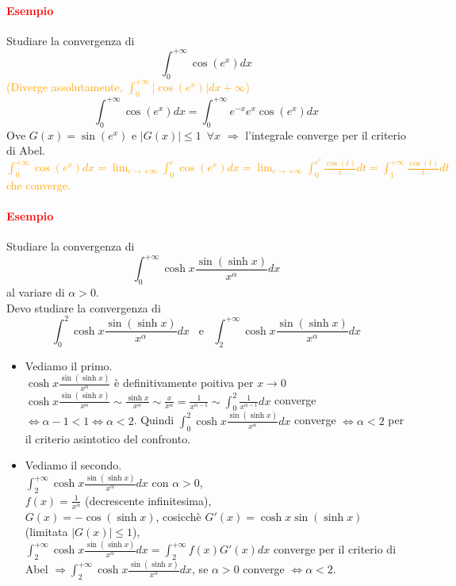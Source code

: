 \documentclass{article}
\begin{document}
\paragraph{\textcolor{red}{Esempio}}
Studiare la convergenza di 
\begin{equation*}
    \int_{0}^{+\infty} \cos(e^x) dx
\end{equation*}
\textcolor{orange}{(Diverge assolutamente, $ \int_{0}^{+\infty} |\cos(e^x)| dx+\infty$)}
\begin{equation*}
    \int_{0}^{+\infty}\cos(e^x)dx= \int_{0}^{+\infty} e^{-x} e^{x}\cos(e^x) dx
\end{equation*}
Ove $G(x)=\sin(e^x)$ e $|G(x)|\leq 1 \,\,\, \forall x$ $\Rightarrow$ l'integrale converge per il criterio di Abel.\\
\textcolor{orange}{$\int_{0}^{+\infty}\cos(e^x)dx=\lim_{c\rightarrow+\infty}\int_{0}^{c}\cos(e^x)dx=\lim_{c\rightarrow+\infty}\int_{0}^{e^c}\frac{\cos(t)}{t}dt=\int_{1}^{+\infty}\frac{\cos(t)}{t}dt$ che converge.}


\paragraph{\textcolor{red}{Esempio}}
Studiare la convergenza di 
\begin{equation*}
    \int_{0}^{+\infty} \cosh x\frac{\sin(\sinh x)}{x^\alpha}dx
\end{equation*}
al variare di $\alpha >0$.\\
Devo studiare la convergenza di 
\begin{equation*}
    \int_{0}^{2} \cosh x\frac{\sin(\sinh x)}{x^\alpha}dx\,\,\,\,\, \text{e}\,\,\,\,\, \int_{2}^{+\infty} \cosh x\frac{\sin(\sinh x)}{x^\alpha}dx
\end{equation*}
\begin{itemize}
    \item Vediamo il primo.\\
        $\cosh x\frac{\sin(\sinh x)}{x^\alpha}$ è definitivamente poitiva per $x \rightarrow 0$\\
        $ \cosh x\frac{\sin(\sinh x)}{x^\alpha} \sim \frac{\sinh x}{x^\alpha}\sim \frac{x}{x^\alpha}=\frac{1}{x^{\alpha-1}}\sim  \int_{0}^{2} \frac{1}{x^{\alpha-1}}dx$ converge $\Leftrightarrow \alpha-1 <1 \Leftrightarrow \alpha <2$. Quindi $ \int_{0}^{2} \cosh x\frac{\sin(\sinh x)}{x^\alpha}dx$ converge $\Leftrightarrow \alpha < 2$ per il criterio asintotico del confronto.
    \item Vediamo il secondo.\\
    $\int_{2}^{+\infty} \cosh x\frac{\sin(\sinh x)}{x^\alpha}dx$ con $\alpha >0$,\\ $f(x)=\frac{1}{x^\alpha}$ (decrescente infinitesima),\\
    $G(x)=-\cos(\sinh x)$, cosicchè $G'(x)=\cosh x \sin(\sinh x)$ (limitata $|G(x)|\leq 1$),\\
    $\int_{2}^{+\infty} \cosh x\frac{\sin(\sinh x)}{x^\alpha}dx = \int_{2}^{+\infty} f(x)G'(x)dx$ converge per il criterio di Abel $\Rightarrow \int_{2}^{+\infty} \cosh x\frac{\sin(\sinh x)}{x^\alpha}dx$, se $ \alpha > 0$ converge $\Leftrightarrow \alpha <2$. 
\end{itemize}
\end{document}
